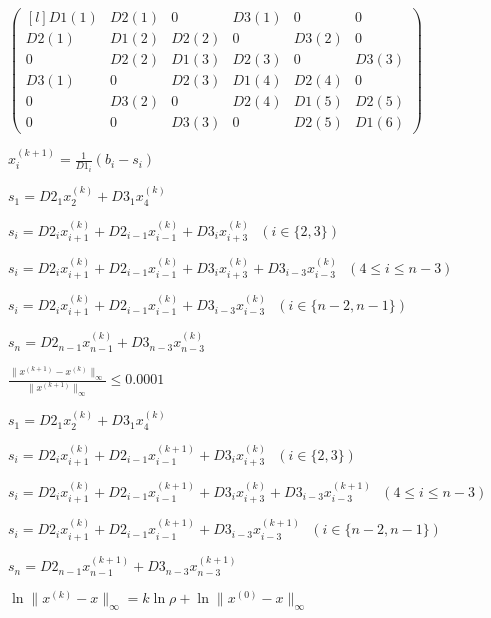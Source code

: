 \documentclass{article}
\begin{document}
	$
	\begin{pmatrix*}[l]
		D1(1) & D2(1) & 0 & D3(1) & 0 & 0 \\
		D2(1) & D1(2) & D2(2) & 0 & D3(2) & 0 \\
		0 & D2(2) & D1(3) & D2(3) & 0 & D3(3)\\
		D3(1) & 0 & D2(3) & D1(4) & D2(4) & 0 \\
		0 & D3(2) & 0 & D2(4) & D1(5) & D2(5) \\
		0 & 0 & D3(3) & 0 & D2(5) & D1(6)
	\end{pmatrix*}
	$
	
	$
	x_i^{(k+1)} = 
	\frac{1}{D1_i}(b_i-s_i)
	$
	
	$ 
	s_1 = D2_1x^{(k)}_2 + D3_1x_4^{(k)}
	$
	
	$
	s_i =  D2_ix^{(k)}_{i+1} + D2_{i-1}x^{(k)}_{i-1} + D3_ix^{(k)}_{i+3} \text{ } 
	 (i\in\{2,3\})
	$ 
	
	$ 
	s_i = D2_ix^{(k)}_{i+1} + D2_{i-1}x^{(k)}_{i-1} + D3_ix^{(k)}_{i+3} + D3_{i-3}x_{i-3}^{(k)} \text{ } 
		 (4 \leq i \leq n-3)
	$
	
	$ 
	s_i = D2_ix^{(k)}_{i+1} + D2_{i-1}x^{(k)}_{i-1} + D3_{i-3}x^{(k)}_{i-3} \text{ } 
	 (i \in\{n-2,n-1\})
	$
	
	$
	s_n = D2_{n-1}x^{(k)}_{n-1} + D3_{n-3}x^{(k)}_{n-3}
	$
	
	$
	\frac{\parallel x^{(k+1)} - x^{(k)} \parallel _\infty}{\parallel x^{(k+1)} \parallel _\infty} \leq 0.0001
	$	

	$ 
	s_1 = D2_1x^{(k)}_2 + D3_1x_4^{(k)}
	$
	
	$
	s_i =  D2_ix^{(k)}_{i+1} + D2_{i-1}x^{(k+1)}_{i-1} + D3_ix^{(k)}_{i+3} \text{ } 
 (i\in\{2,3\})
	$ 
	
	$ 
	s_i = D2_ix^{(k)}_{i+1} + D2_{i-1}x^{(k+1)}_{i-1} + D3_ix^{(k)}_{i+3} + D3_{i-3}x_{i-3}^{(k+1)} \text{ } 
	 (4 \leq i \leq n-3)
	$
	
	$ 
	s_i = D2_ix^{(k)}_{i+1} + D2_{i-1}x^{(k+1)}_{i-1} + D3_{i-3}x^{(k+1)}_{i-3} \text{ } 
	 (i \in\{n-2,n-1\})
	$
	
	$
	s_n = D2_{n-1}x^{(k+1)}_{n-1} + D3_{n-3}x^{(k+1)}_{n-3}
	$
	
	$
	\ln{\parallel x^{(k)} - x \parallel_\infty} = k\ln{\rho} + \ln{\parallel x^{(0)} - x \parallel_\infty}
	$
\end{document}
